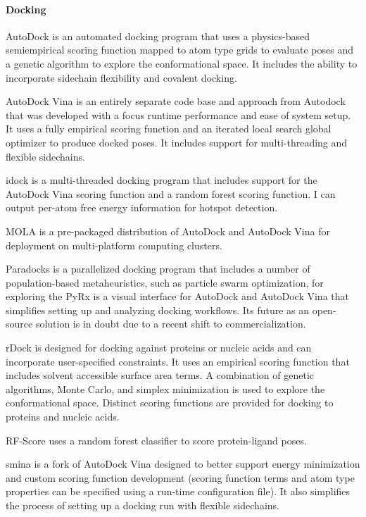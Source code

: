 \paragraph{Docking}

AutoDock \cite{Morris_2009} is an automated docking program that uses a physics-based semiempirical scoring function \cite{Huey_2007} mapped to atom type grids to evaluate poses and a genetic algorithm to explore the conformational space.  It includes the ability to incorporate sidechain flexibility and covalent docking.

AutoDock Vina \cite{Trott_2009} is an entirely separate code base and approach from Autodock that was developed with a focus runtime performance and ease of system setup. It uses a fully empirical scoring function and an iterated local search global optimizer to produce docked poses. It includes support for multi-threading and flexible sidechains.

idock \cite{Li_2012} is a multi-threaded docking program that includes support for the AutoDock Vina scoring function and a random forest scoring function. I can output per-atom free energy information for hotspot detection.

MOLA \cite{Abreu_2010} is a pre-packaged distribution of AutoDock and AutoDock Vina for deployment on multi-platform computing clusters.

Paradocks \cite{Meier_2010} is a parallelized docking program that includes a number of population-based metaheuristics, such as particle swarm optimization, for exploring the 
PyRx \cite{Dallakyan_2014} is a visual interface for AutoDock and AutoDock Vina that simplifies setting up and analyzing docking workflows.  Its future as an open-source solution is in doubt due to a recent shift to commercialization.

rDock \cite{Ruiz_Carmona_2014}  is designed for docking against proteins or nucleic acids and can incorporate user-specified constraints. It uses an empirical scoring function that includes solvent accessible surface area terms. A combination of genetic algorithms, Monte Carlo, and simplex minimization is used to explore the conformational space. Distinct scoring functions are provided for docking to proteins and nucleic acids.

RF-Score \cite{Li_2015,Ballester_2010} uses a random forest classifier to score protein-ligand poses.

smina \cite{Koes_2013} is a fork of AutoDock Vina designed to better support energy minimization and custom scoring function development (scoring function terms and atom type properties can be specified using a run-time configuration file). It also simplifies the process of setting up a docking run with flexible sidechains.


